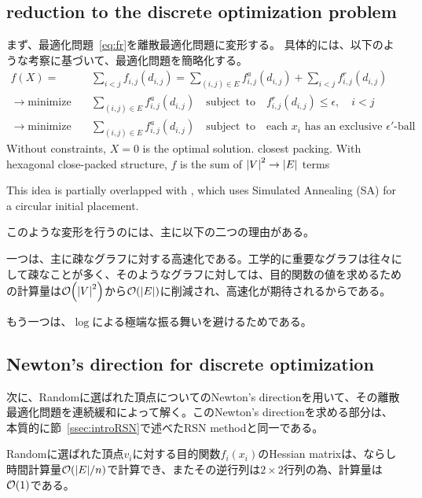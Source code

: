 \documentclass[dvipdfmx,journal]{IEEEtran}
\begin{document}
\subsection{reduction to the discrete optimization problem}\label{ssec:reduction}

まず、最適化問題~\eqref{eq:fr}を離散最適化問題に変形する。
具体的には、以下のような考察に基づいて、最適化問題を簡略化する。
\begin{align*}
  f(X) =                      & \sum_{i<j} f_{i,j}(d_{i,j}) = \sum_{(i,j)\in E} f^a_{i,j}(d_{i,j}) + \sum_{i<j} f^r_{i,j}(d_{i,j})                                \\
  \to \mathrm{minimize} \quad & \sum_{(i,j)\in E} f^a_{i,j}(d_{i,j}) \quad \mathrm{subject \enspace to} \quad f^r_{i,j}(d_{i,j}) \leq \epsilon, \quad i<j         \\
  \to \mathrm{minimize} \quad & \sum_{(i,j)\in E} f^a_{i,j}(d_{i,j}) \quad \mathrm{subject \enspace to} \quad \text{each $x_i$ has an exclusive $\epsilon'$-ball}
\end{align*}
Without constraints, $X=0$ is the optimal solution.
closest packing.
With hexagonal close-packed structure, $f$ is the sum of $\abs{V}^2 \to \abs{E}$ terms

This idea is partially overlapped with \cite{ghassemitoosiSimulatedAnnealingPreProcessing2016,s22145179}, which uses Simulated Annealing (SA) for a circular initial placement.

このような変形を行うのには、主に以下の二つの理由がある。

一つは、主に疎なグラフに対する高速化である。工学的に重要なグラフは往々にして疎なことが多く、そのようなグラフに対しては、目的関数の値を求めるための計算量は$\order{\abs{V}^2}$から$\order{\abs{E}}$に削減され、高速化が期待されるからである。

もう一つは、$\log$による極端な振る舞いを避けるためである。

\subsection{Newton's direction for discrete optimization}\label{ssec:newtonDirection}

次に、Randomに選ばれた頂点についてのNewton's directionを用いて、その離散最適化問題を連続緩和によって解く。このNewton's directionを求める部分は、本質的に節~\ref{ssec:introRSN}で述べたRSN methodと同一である。

Randomに選ばれた頂点$v_i$に対する目的関数$f_i(x_i)$のHessian matrixは、ならし時間計算量$\order{\abs{E}/n}$で計算でき、またその逆行列は$2 \times 2$行列の為、計算量は$\order{1}$である。
\end{document}
